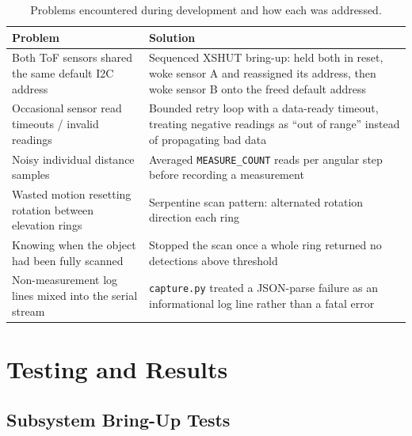 \documentclass[11pt]{article}
\begin{document}
\begin{table}[h]
  \centering
  \begin{tabular}{@{}p{5.5cm}p{9cm}@{}}
    \toprule
    \textbf{Problem} & \textbf{Solution} \\
    \midrule
    Both ToF sensors shared the same default I2C address & Sequenced XSHUT bring-up: held both in reset, woke sensor A and reassigned its address, then woke sensor B onto the freed default address \\[4pt]
    Occasional sensor read timeouts / invalid readings & Bounded retry loop with a data-ready timeout, treating negative readings as ``out of range'' instead of propagating bad data \\[4pt]
    Noisy individual distance samples & Averaged \texttt{MEASURE\_COUNT} reads per angular step before recording a measurement \\[4pt]
    Wasted motion resetting rotation between elevation rings & Serpentine scan pattern: alternated rotation direction each ring \\[4pt]
    Knowing when the object had been fully scanned & Stopped the scan once a whole ring returned no detections above threshold \\[4pt]
    Non-measurement log lines mixed into the serial stream & \texttt{capture.py} treated a JSON-parse failure as an informational log line rather than a fatal error \\
    \bottomrule
  \end{tabular}
  \caption{Problems encountered during development and how each was addressed.}
\end{table}

\section{Testing and Results}
\label{sec:results}

\subsection{Subsystem Bring-Up Tests}
\end{document}
